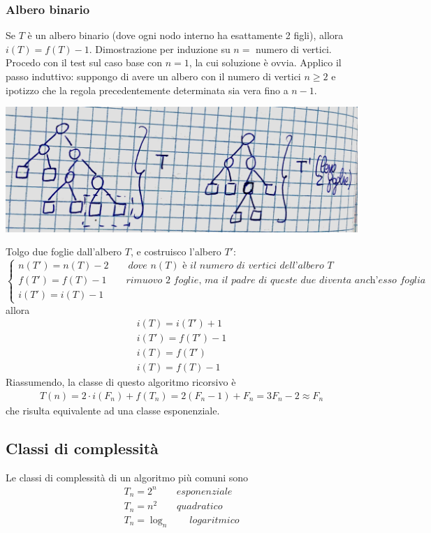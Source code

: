 \documentclass[italian]{article}
\begin{document}
\subsubsection{Albero binario}
Se $T$ è un albero binario (dove ogni nodo interno ha esattamente 2 figli), allora $i(T) = f(T) - 1$. Dimostrazione per induzione su $n=$ numero di vertici. Procedo con il test sul caso base con $n=1$, la cui soluzione è ovvia. Applico il passo induttivo: suppongo di avere un albero con il numero di vertici $n \geq 2$ e ipotizzo che la regola precedentemente determinata sia vera fino a $n-1$.
\begin{center}
	\includegraphics[width=0.5\linewidth]{images/induzione-albero-binario}
\end{center}

Tolgo due foglie dall'albero $T$, e costruisco l'albero $T'$:
\[
	\begin{cases*}
		n(T') = n(T) - 2 \qquad \textit{dove $n(T)$ è il numero di vertici dell'albero $T$}\\
		f(T') = f(T)-1 \qquad \textit{rimuovo 2 foglie, ma il padre di queste due diventa anch'esso foglia}\\
		i(T') = i(T) - 1
	\end{cases*}
\]
allora 
\begin{gather*}
	i(T) = i(T') + 1 \\
	i(T') = f(T') - 1 \\
	i(T) = f(T') \\
	i(T) = f(T)-1
\end{gather*}
Riassumendo, la classe di questo algoritmo ricorsivo è
\begin{gather*}
	T(n) = 2\cdot i(F_n) + f(T_n) = 2(F_n - 1) + F_n = 3F_n - 2 \approx F_n
\end{gather*}
che risulta equivalente ad una classe esponenziale.

\subsection*{Classi di complessità}
Le classi di complessità di un algoritmo più comuni sono 
\begin{gather*}
T_{n} = 2^n \qquad \textit{esponenziale}\\
T_{n} = n^2 \qquad \textit{quadratico}\\
T_{n} = \log_n \qquad \textit{logaritmico}
\end{gather*}
\end{document}
